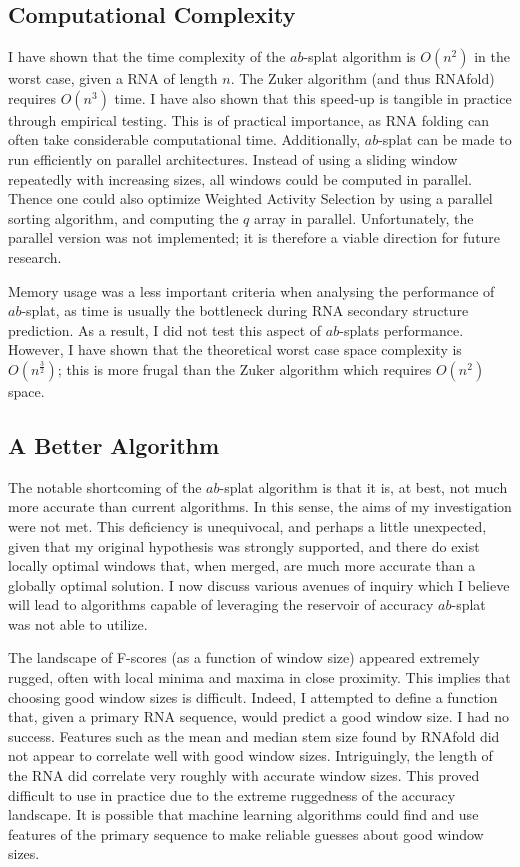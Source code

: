 \documentclass{cshonours}
\begin{document}
\subsection{Computational Complexity}

I have shown that the time complexity of the $ab$-splat algorithm is $O(n^2)$ in the worst case, given a RNA of length $n$. The Zuker algorithm (and thus RNAfold) requires $O(n^3)$ time. I have also shown that this speed-up is tangible in practice through empirical testing. This is of practical importance, as RNA folding can often take considerable computational time. Additionally, $ab$-splat can be made to run efficiently on parallel architectures. Instead of using a sliding window repeatedly with increasing sizes, all windows could be computed in parallel. Thence one could also optimize Weighted Activity Selection by using a parallel sorting algorithm, and computing the $q$ array in parallel. Unfortunately, the parallel version was not implemented; it is therefore a viable direction for future research.

Memory usage was a less important criteria when analysing the performance of $ab$-splat, as time is usually the bottleneck during RNA secondary structure prediction. As a result, I did not test this aspect of $ab$-splats performance. However, I have shown that the theoretical worst case space complexity is $O(n^\frac{3}{2})$; this is more frugal than the Zuker algorithm which requires $O(n^2)$ space.

\subsection{A Better Algorithm}

The notable shortcoming of the $ab$-splat algorithm is that it is, at best, not much more accurate than current algorithms. In this sense, the aims of my investigation were not met. This deficiency is unequivocal, and perhaps a little unexpected, given that my original hypothesis was strongly supported, and there do exist locally optimal windows that, when merged, are much more accurate than a globally optimal solution. I now discuss various avenues of inquiry which I believe will lead to algorithms capable of leveraging the reservoir of accuracy $ab$-splat was not able to utilize.

The landscape of F-scores (as a function of window size) appeared extremely rugged, often with local minima and maxima in close proximity. This implies that choosing good window sizes is difficult. Indeed, I attempted to define a function that, given a primary RNA sequence, would predict a good window size. I had no success. Features such as the mean and median stem size found by RNAfold did not appear to correlate well with good window sizes. Intriguingly, the length of the RNA did correlate very roughly with accurate window sizes. This proved difficult to use in practice due to the extreme ruggedness of the accuracy landscape. It is possible that machine learning algorithms could find and use features of the primary sequence to make reliable guesses about good window sizes. 
\end{document}
